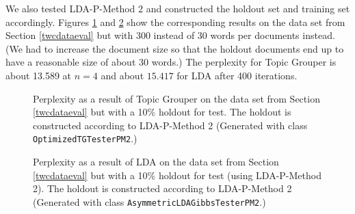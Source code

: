 \documentclass[10pt, a4paper, oneside]{article}
\begin{document}
We also tested LDA-P-Method 2 and constructed the holdout set and training set accordingly. Figures \ref{perplexity3} and \ref{perplexity4} show the corresponding results on the data set from Section \ref{twcdataeval} but with 300 instead of 30 words per documents instead. (We had to increase the document size so that the holdout documents end up to have a reasonable size of about 30 words.) The perplexity for Topic Grouper is about 13.589 at $n = 4$ and about $15.417$ for LDA after 400 iterations.

\begin{figure}
\caption{Perplexity as a result of Topic Grouper on the data set from Section \ref{twcdataeval} but with a 10\% holdout for test. The holdout is constructed according to LDA-P-Method 2 (Generated with class \texttt{OptimizedTGTesterPM2}.)}
\label{perplexity3}
\end{figure}

\begin{figure}
\caption{Perplexity as a result of LDA on the data set from Section \ref{twcdataeval} but with a 10\% holdout for test (using LDA-P-Method 2). The holdout is constructed according to LDA-P-Method 2 (Generated with class \texttt{AsymmetricLDAGibbsTesterPM2}.)}
\label{perplexity4}
\end{figure}
\end{document}
